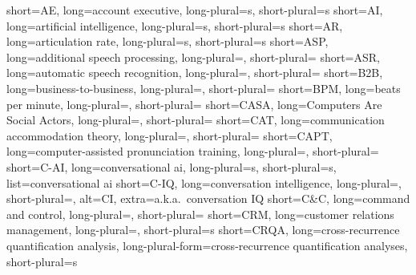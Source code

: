 
		{short=AE,		long=account executive,								long-plural=s, short-plural=s}
		{short=AI,		long=artificial intelligence,						long-plural=s, short-plural=s}
		{short=AR,		long=articulation rate,								long-plural=s, short-plural=s}
	{short=ASP,		long=additional speech processing,  				long-plural=, short-plural=}
	{short=ASR, 	long=automatic speech recognition, 					long-plural=, short-plural=}
	{short=B2B, 	long=business-to-business,							long-plural=, short-plural=}
	{short=BPM, 	long=beats per minute, 								long-plural=, short-plural=}
	{short=CASA, 	long=Computers Are Social Actors, 					long-plural=, short-plural=}
	{short=CAT, 	long=communication accommodation theory, 			long-plural=, short-plural=}
	{short=CAPT, 	long=computer-assisted pronunciation training, 		long-plural=, short-plural=}
	{short=C-AI, 	long=conversational \acs*{ai},						long-plural=s, short-plural=s, list=conversational \acs*{ai}}
	{short=C-IQ,	long=conversation intelligence, 					long-plural=, short-plural=, alt=CI, extra=a.k.a.\ conversation IQ}
	{short=C\&C, 	long=command and control, 							long-plural=, short-plural=}
	{short=CRM, 	long=customer relations management,					long-plural=, short-plural=s}
	{short=CRQA, 	long=cross-recurrence quantification analysis,		long-plural-form=cross-recurrence quantification analyses, short-plural=s}
